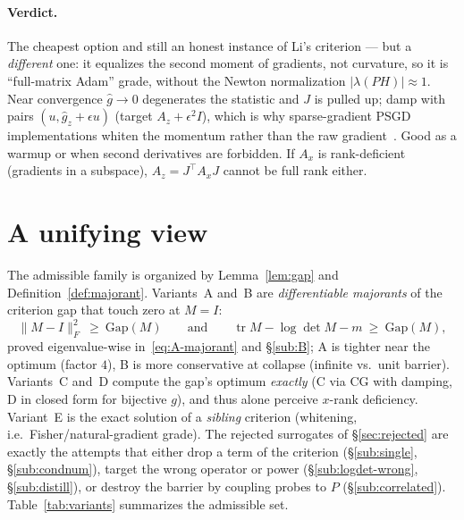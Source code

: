 \documentclass[11pt]{article}
\theoremstyle{plain}
\theoremstyle{definition}
\theoremstyle{remark}
\DeclareMathOperator{\tr}{tr}
\newcommand{\Fnorm}[1]{\lVert #1 \rVert_F}
\begin{document}
\paragraph{Verdict.} The cheapest option and still an honest instance of Li's criterion ---
but a \emph{different} one: it equalizes the second moment of gradients, not curvature, so
it is ``full-matrix Adam'' grade, without the Newton normalization $|\lambda(PH)|\approx1$.
Near convergence $\hat g\to0$ degenerates the statistic and $J$ is pulled up; damp with
pairs $(u,\hat g_z+\epsilon u)$ (target $A_z+\epsilon^2 I$), which is why sparse-gradient
PSGD implementations whiten the momentum rather than the raw gradient~\cite{li2024}. Good as
a warmup or when second derivatives are forbidden. If $A_x$ is rank-deficient (gradients in
a subspace), $A_z=J^{\!\top}A_xJ$ cannot be full rank either.

\section{A unifying view}
\label{sec:unify}

The admissible family is organized by Lemma~\ref{lem:gap} and
Definition~\ref{def:majorant}. Variants~A and~B are \emph{differentiable majorants} of the
criterion gap that touch zero at $M=I$:
\begin{equation}
  \Fnorm{M-I}^2\ \ge\ \mathrm{Gap}(M)
  \qquad\text{and}\qquad
  \tr M-\log\det M-m\ \ge\ \mathrm{Gap}(M),
\end{equation}
proved eigenvalue-wise in~\eqref{eq:A-majorant} and \S\ref{sub:B}; A is tighter near the
optimum (factor $4$), B is more conservative at collapse (infinite vs.\ unit barrier).
Variants~C and~D compute the gap's optimum \emph{exactly} (C via CG with damping, D in
closed form for bijective $g$), and thus alone perceive $x$-rank deficiency. Variant~E is
the exact solution of a \emph{sibling} criterion (whitening, i.e.\ Fisher/natural-gradient
grade). The rejected surrogates of \S\ref{sec:rejected} are exactly the attempts that either
drop a term of the criterion (\S\ref{sub:single}, \S\ref{sub:condnum}), target the wrong
operator or power (\S\ref{sub:logdet-wrong}, \S\ref{sub:distill}), or destroy the barrier by
coupling probes to $P$ (\S\ref{sub:correlated}). Table~\ref{tab:variants} summarizes the
admissible set.
\end{document}
